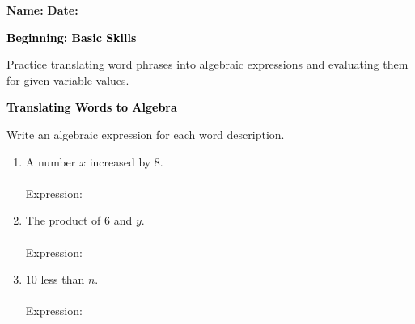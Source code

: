 \documentclass[12pt, letterpaper, fleqn]{article}
\newcommand{\blanklong}{\underline{\hspace{6.5cm}}}
\begin{document}
\textbf{Name:} \underline{\hspace{5cm}}
\hfill
\textbf{Date:} \underline{\hspace{3cm}}\\

\begin{tcolorbox}[colback=black!10]
    \large\textcolor{black}{\textbf{Beginning: Basic Skills}}
\end{tcolorbox}

\vspace{3mm}
\noindent
Practice translating word phrases into algebraic expressions and evaluating them for given variable values.

\vspace{4mm}

\begin{tcolorbox}[colback=black!10]
\large\textcolor{black}{\textbf{Translating Words to Algebra}}
\end{tcolorbox}

\noindent
Write an algebraic expression for each word description.

\vspace{3mm}

\begin{enumerate}[itemsep=1.5cm, leftmargin=0.6cm]

\item A number $x$ increased by 8. \\ \\
Expression: \blanklong

\vspace{1.5cm}

\item The product of 6 and $y$. \\ \\
Expression: \blanklong

\vspace{1.5cm}

\item 10 less than $n$. \\ \\
Expression: \blanklong

\vspace{1.5cm}

\end{enumerate}
\end{document}

